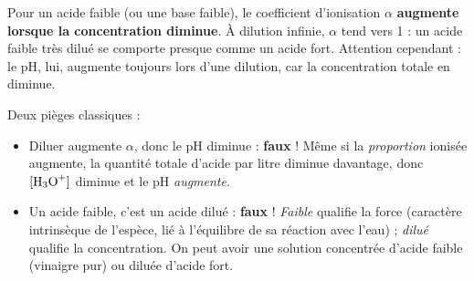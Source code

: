 \documentclass[11pt]{article}
\begin{document}
\begin{propriete}
Pour un acide faible (ou une base faible), le coefficient d'ionisation $\alpha$ \textbf{augmente lorsque la concentration diminue}. À dilution infinie, $\alpha$ tend vers 1 : un acide faible très dilué se comporte presque comme un acide fort. Attention cependant : le pH, lui, augmente toujours lors d'une dilution, car la concentration totale en  diminue.
\end{propriete}

\begin{attention}
Deux pièges classiques :
\begin{itemize}
\item \og Diluer augmente $\alpha$, donc le pH diminue \fg{} : \textbf{faux} ! Même si la \emph{proportion} ionisée augmente, la quantité totale d'acide par litre diminue davantage, donc $[\ce{H3O+}]$ diminue et le pH \emph{augmente}.
\item \og Un acide faible, c'est un acide dilué \fg{} : \textbf{faux} ! \emph{Faible} qualifie la force (caractère intrinsèque de l'espèce, lié à l'équilibre de sa réaction avec l'eau) ; \emph{dilué} qualifie la concentration. On peut avoir une solution concentrée d'acide faible (vinaigre pur) ou diluée d'acide fort.
\end{itemize}
\end{attention}
\end{document}
